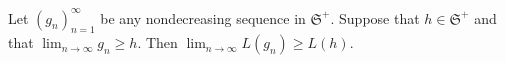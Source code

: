 Let $(g_n)_{n=1}^{\infty}$ be any nondecreasing sequence in $\mathfrak{S}^+$. Suppose that $h \in \mathfrak{S}^+$ and that $\lim_{n \to \infty} g_n \geq h$. Then $\lim_{n \to \infty} L(g_n) \geq L(h)$.
